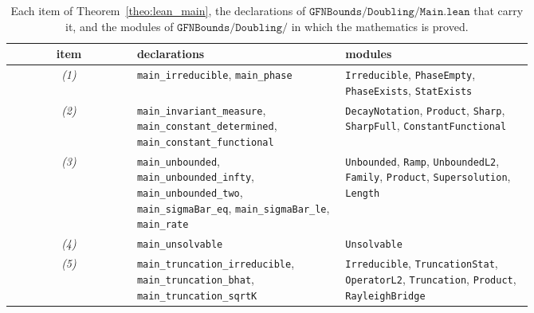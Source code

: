 \begin{table}[t]
\centering
\caption{Each item of Theorem~\ref{theo:lean_main}, the declarations of
$\texttt{GFNBounds/Doubling/Main.lean}$ that carry it, and the modules of
$\texttt{GFNBounds/Doubling/}$ in which the mathematics is proved.}
\label{tab:lean_map}
\small
\begin{tabular}{@{}c p{0.40\linewidth} p{0.36\linewidth}@{}}
\hline
item & declarations & modules \\
\hline
\emph{(1)} & \texttt{main\_irreducible}, \texttt{main\_phase} &
\texttt{Irreducible}, \texttt{PhaseEmpty}, \texttt{PhaseExists}, \texttt{StatExists} \\
\emph{(2)} & \texttt{main\_invariant\_measure}, \texttt{main\_constant\_determined},
\texttt{main\_constant\_functional} &
\texttt{DecayNotation}, \texttt{Product}, \texttt{Sharp}, \texttt{SharpFull},
\texttt{ConstantFunctional} \\
\emph{(3)} & \texttt{main\_unbounded}, \texttt{main\_unbounded\_infty},
\texttt{main\_unbounded\_two}, \texttt{main\_sigmaBar\_eq}, \texttt{main\_sigmaBar\_le},
\texttt{main\_rate} &
\texttt{Unbounded}, \texttt{Ramp}, \texttt{UnboundedL2}, \texttt{Family}, \texttt{Product},
\texttt{Supersolution}, \texttt{Length} \\
\emph{(4)} & \texttt{main\_unsolvable} & \texttt{Unsolvable} \\
\emph{(5)} & \texttt{main\_truncation\_irreducible}, \texttt{main\_truncation\_bhat},
\texttt{main\_truncation\_sqrtK} &
\texttt{Irreducible}, \texttt{TruncationStat}, \texttt{OperatorL2}, \texttt{Truncation},
\texttt{Product}, \texttt{RayleighBridge} \\
\hline
\end{tabular}
\end{table}

